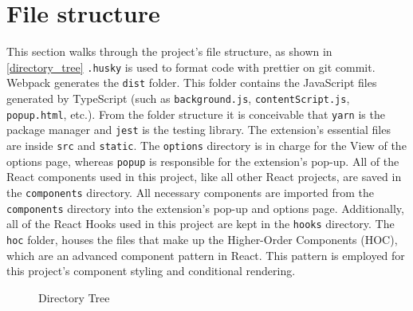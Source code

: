 \section{File structure}
This section walks through the project's file structure, as shown in \autoref{directory_tree} \texttt{.husky} is used to format code with prettier on git commit. Webpack generates the \texttt{dist} folder. This folder contains the JavaScript files generated by TypeScript (such as \texttt{background.js}, \texttt{contentScript.js}, \texttt{popup.html}, etc.). From the folder structure it is conceivable that \texttt{yarn} is the package manager and \texttt{jest} is the testing library. The extension's essential files are inside \texttt{src} and \texttt{static}. The \texttt{options} directory is in charge for the View of the options page, whereas \texttt{popup} is responsible for the extension's pop-up. All of the React components used in this project, like all other React projects, are saved in the \texttt{components} directory. All necessary components are imported from the \texttt{components} directory into the extension's pop-up and options page. Additionally, all of the React Hooks used in this project are kept in the \texttt{hooks} directory. The \texttt{hoc} folder, houses the files that make up the Higher-Order Components (HOC), which are an advanced component pattern in React. This pattern is employed for this project's component styling and conditional rendering.

\begin{figure}[H]
  \caption{Directory Tree}
  \label{directory_tree}
\end{figure}

